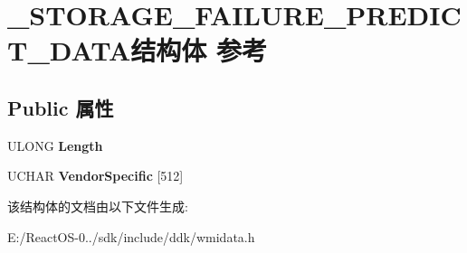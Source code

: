 \hypertarget{struct___s_t_o_r_a_g_e___f_a_i_l_u_r_e___p_r_e_d_i_c_t___d_a_t_a}{}\section{\+\_\+\+S\+T\+O\+R\+A\+G\+E\+\_\+\+F\+A\+I\+L\+U\+R\+E\+\_\+\+P\+R\+E\+D\+I\+C\+T\+\_\+\+D\+A\+T\+A结构体 参考}
\label{struct___s_t_o_r_a_g_e___f_a_i_l_u_r_e___p_r_e_d_i_c_t___d_a_t_a}
\subsection*{Public 属性}
\begin{DoxyCompactItemize}
\item 
\mbox{\label{struct___s_t_o_r_a_g_e___f_a_i_l_u_r_e___p_r_e_d_i_c_t___d_a_t_a_aff5a8588f524320d45eda214c6675c66}} 
U\+L\+O\+NG {\bfseries Length}
\item 
\mbox{\label{struct___s_t_o_r_a_g_e___f_a_i_l_u_r_e___p_r_e_d_i_c_t___d_a_t_a_a4692b5c26af0938fddef6efe9d1983db}} 
U\+C\+H\+AR {\bfseries Vendor\+Specific} \mbox{[}512\mbox{]}
\end{DoxyCompactItemize}


该结构体的文档由以下文件生成\+:\begin{DoxyCompactItemize}
\item 
E\+:/\+React\+O\+S-\/0../sdk/include/ddk/wmidata.\+h\end{DoxyCompactItemize}
